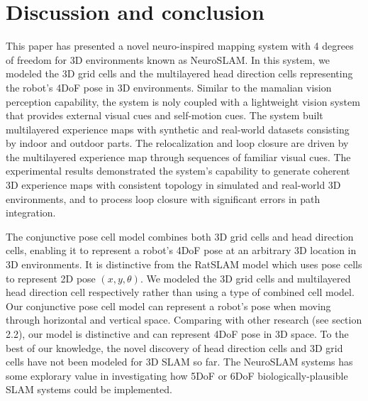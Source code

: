 \section{Discussion and conclusion}
\label{sec:conclusion}
\hspace{1pc}This paper has presented a novel neuro-inspired mapping system with 4 degrees of freedom for 3D environments known as NeuroSLAM.
In this system, we modeled the 3D grid cells and the multilayered head direction cells representing the robot's 4DoF pose in 3D environments.
Similar to the mamalian vision perception capability, the system is noly coupled with a lightweight vision system that provides external visual cues and self-motion cues.
The system built multilayered experience maps with synthetic and real-world datasets consisting by indoor and outdoor parts.
The relocalization and loop closure are driven by the multilayered experience map through sequences of familiar visual cues.
The experimental results demonstrated the system's capability to generate coherent 3D experience maps with consistent topology in simulated and real-world 3D environments, and to process loop closure with significant errors in path integration.


The conjunctive pose cell model combines both 3D grid cells and head direction cells, enabling it to represent a robot's 4DoF pose at an arbitrary 3D location in 3D environments.
It is distinctive from the RatSLAM model which uses pose cells to represent 2D pose $ (x, y, \theta) $.
We modeled the 3D grid cells and multilayered head direction cell respectively rather than using a type of combined cell model.
Our conjunctive pose cell model can represent a robot's pose when moving through horizontal and vertical space.
Comparing with other research (see section 2.2), our model is distinctive and can represent 4DoF pose in 3D space.
To the best of our knowledge, the novel discovery of head direction cells and 3D grid cells have not been modeled for 3D SLAM so far.
The NeuroSLAM systems has some explorary value in investigating how 5DoF or 6DoF biologically-plausible SLAM systems could be implemented.


